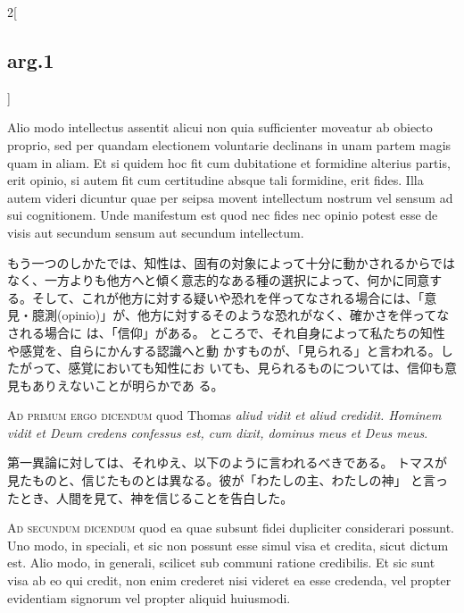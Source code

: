 \documentclass[paper=a4paper,fontsize=10pt,jafontsize=9pt,titlepage]{jlreq}
\begin{document}
\begin{paracol}{2}[\subsection{arg.1}]
\switchcolumn*

Alio modo intellectus assentit alicui non quia sufficienter
moveatur ab obiecto proprio, sed per quandam electionem voluntarie
declinans in unam partem magis quam in aliam. Et si quidem hoc fit cum
dubitatione et formidine alterius partis, erit opinio, si autem fit cum
certitudine absque tali formidine, erit fides. Illa autem videri
dicuntur quae per seipsa movent intellectum nostrum vel sensum ad sui
cognitionem. Unde manifestum est quod nec fides nec opinio potest esse
de visis aut secundum sensum aut secundum intellectum.

\switchcolumn

もう一つのしかたでは、知性は、固有の対象によって十分に動かされるからでは
 なく、一方よりも他方へと傾く意志的なある種の選択によって、何かに同意す
 る。そして、これが他方に対する疑いや恐れを伴ってなされる場合には、「意
 見・臆測(opinio)」が、他方に対するそのような恐れがなく、確かさを伴ってなされる場合に
 は、「信仰」がある。
ところで、それ自身によって私たちの知性や感覚を、自らにかんする認識へと動
 かすものが、「見られる」と言われる。したがって、感覚においても知性にお
 いても、見られるものについては、信仰も意見もありえないことが明らかであ
 る。

\switchcolumn*[\subsection{ad.1}]

{\scshape Ad primum ergo dicendum} quod Thomas {\itshape aliud vidit et aliud
credidit. Hominem vidit et Deum credens confessus est, cum dixit,
dominus meus et Deus meus}.

\switchcolumn

第一異論に対しては、それゆえ、以下のように言われるべきである。
トマスが見たものと、信じたものとは異なる。彼が「わたしの主、わたしの神」
 と言ったとき、人間を見て、神を信じることを告白した。

\switchcolumn*[\subsection{ad.2}]

{\scshape Ad secundum dicendum} quod ea quae subsunt fidei dupliciter
considerari possunt. Uno modo, in speciali, et sic non possunt esse
simul visa et credita, sicut dictum est. Alio modo, in generali,
scilicet sub communi ratione credibilis. Et sic sunt visa ab eo qui
credit, non enim crederet nisi videret ea esse credenda, vel propter
evidentiam signorum vel propter aliquid huiusmodi.


\end{paracol}
\end{document}
